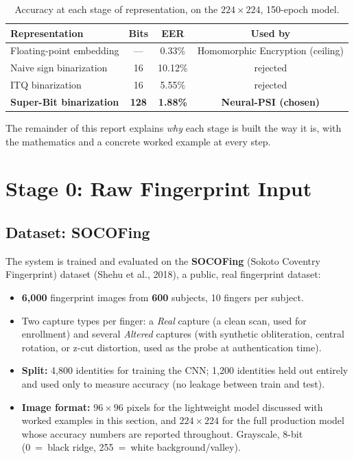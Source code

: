 \documentclass[11pt]{article}
\begin{document}
\begin{table}[h]
\centering
\begin{tabular}{lccc}
\toprule
Representation & Bits & EER & Used by \\
\midrule
Floating-point embedding & --- & 0.33\% & Homomorphic Encryption (ceiling) \\
Naive sign binarization  & 16  & 10.12\% & rejected \\
ITQ binarization         & 16  & 5.55\%  & rejected \\
\textbf{Super-Bit binarization} & \textbf{128} & \textbf{1.88\%} & \textbf{Neural-PSI (chosen)} \\
\bottomrule
\end{tabular}
\caption{Accuracy at each stage of representation, on the $224\times224$, 150-epoch model.}
\label{tab:summary}
\end{table}

The remainder of this report explains \emph{why} each stage is built the way it is, with
the mathematics and a concrete worked example at every step.

\section{Stage 0: Raw Fingerprint Input}

\subsection{Dataset: SOCOFing}

The system is trained and evaluated on the \textbf{SOCOFing} (Sokoto Coventry Fingerprint)
dataset (Shehu et al., 2018), a public, real fingerprint dataset:

\begin{itemize}[noitemsep]
  \item \textbf{6{,}000} fingerprint images from \textbf{600} subjects, 10 fingers per
        subject.
  \item Two capture types per finger: a \emph{Real} capture (a clean scan, used for
        enrollment) and several \emph{Altered} captures (with synthetic obliteration,
        central rotation, or z-cut distortion, used as the probe at authentication time).
  \item \textbf{Split:} 4{,}800 identities for training the CNN; 1{,}200 identities held
        out entirely and used only to measure accuracy (no leakage between train and
        test).
  \item \textbf{Image format:} $96\times96$ pixels for the lightweight model discussed
        with worked examples in this section, and $224\times224$ for the full production
        model whose accuracy numbers are reported throughout. Grayscale, 8-bit
        (0~=~black ridge, 255~=~white background/valley).
\end{itemize}
\end{document}
